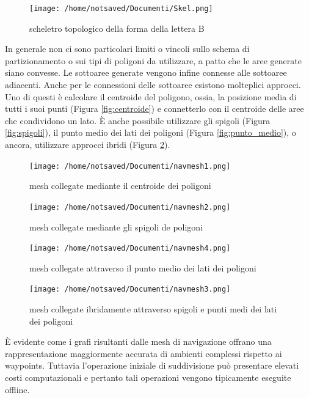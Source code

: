 \documentclass[12pt]{book}
\begin{document}
\begin{figure}[htp]
\centering
\texttt{[image: /home/notsaved/Documenti/Skel.png]}
\caption{scheletro topologico della forma della lettera B}
\label{voronoiskel}
\end{figure}
\par{In generale non ci sono particolari limiti o vincoli sullo schema di partizionamento o sui tipi di poligoni da utilizzare, a patto che le aree generate siano convesse. Le sottoaree generate vengono infine connesse alle sottoaree adiacenti. Anche per le connessioni delle sottoaree esistono molteplici approcci. Uno di questi \`e calcolare il centroide del poligono, ossia, la posizione media di tutti i suoi punti (Figura \ref{fig:centroide}) e connetterlo con il centroide delle aree che condividono un lato. \`E anche possibile utilizzare gli spigoli (Figura \ref{fig:spigoli}), il punto medio dei lati dei poligoni (Figura \ref{fig:punto_medio}), o ancora, utilizzare approcci ibridi (Figura \ref{fig:ibrido}).}

\begin{figure}[htp]
  \texttt{[image: /home/notsaved/Documenti/navmesh1.png]}
  \caption{mesh collegate mediante il centroide dei poligoni}\label{fig:centroide}
\endminipage\hfill
{}
  \texttt{[image: /home/notsaved/Documenti/navmesh2.png]}
  \caption{mesh collegate mediante gli spigoli de poligoni}\label{fig:spigoli}
\endminipage\hfill
{}
  \texttt{[image: /home/notsaved/Documenti/navmesh4.png]}
  \caption{mesh collegate attraverso il punto medio dei lati dei poligoni}\label{fig:punto_medio}
\endminipage\hfill
{}%
  \texttt{[image: /home/notsaved/Documenti/navmesh3.png]}
  \caption{mesh collegate ibridamente attraverso spigoli e punti medi dei lati dei poligoni}\label{fig:ibrido}
\endminipage
\end{figure}
\par{\`E evidente come i grafi risultanti dalle mesh di navigazione offrano una rappresentazione maggiormente accurata di ambienti complessi rispetto ai waypoints. Tuttavia l'operazione iniziale di suddivisione pu\`o presentare elevati costi computazionali e pertanto tali operazioni vengono tipicamente eseguite offline. }
\end{document}
